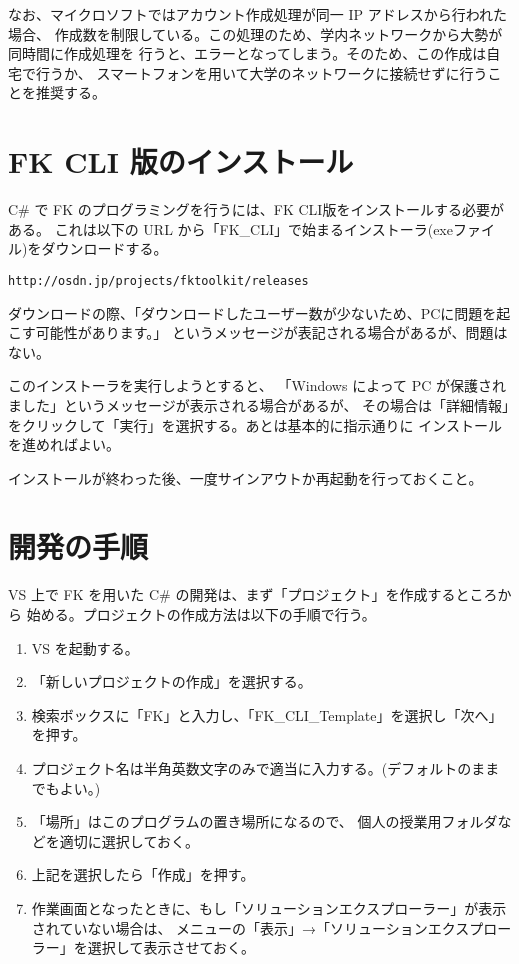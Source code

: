 \documentclass[a4paper]{jsarticle}
\begin{document}
なお、マイクロソフトではアカウント作成処理が同一 IP アドレスから行われた場合、
作成数を制限している。この処理のため、学内ネットワークから大勢が同時間に作成処理を
行うと、エラーとなってしまう。そのため、この作成は自宅で行うか、
スマートフォンを用いて大学のネットワークに接続せずに行うことを推奨する。

\section{FK CLI 版のインストール}

C\# で FK のプログラミングを行うには、FK CLI版をインストールする必要がある。
これは以下の URL から「FK\_CLI」で始まるインストーラ(exeファイル)をダウンロードする。

\begin{screen}
\begin{center}
	\verb+http://osdn.jp/projects/fktoolkit/releases+
\end{center}
\end{screen}
ダウンロードの際、「ダウンロードしたユーザー数が少ないため、PCに問題を起こす可能性があります。」
というメッセージが表記される場合があるが、問題はない。

このインストーラを実行しようとすると、
「Windows によって PC が保護されました」というメッセージが表示される場合があるが、
その場合は「詳細情報」をクリックして「実行」を選択する。あとは基本的に指示通りに
インストールを進めればよい。

インストールが終わった後、一度サインアウトか再起動を行っておくこと。

\section{開発の手順}

VS 上で FK を用いた C\# の開発は、まず「プロジェクト」を作成するところから
始める。プロジェクトの作成方法は以下の手順で行う。

\begin{enumerate}

 \item VS を起動する。

 \item 「新しいプロジェクトの作成」を選択する。

 \item 検索ボックスに「FK」と入力し、「FK\_CLI\_Template」を選択し「次へ」を押す。

 \item プロジェクト名は半角英数文字のみで適当に入力する。(デフォルトのままでもよい。)

 \item 「場所」はこのプログラムの置き場所になるので、
		個人の授業用フォルダなどを適切に選択しておく。

 \item 上記を選択したら「作成」を押す。

 \item 作業画面となったときに、もし「ソリューションエクスプローラー」が表示されていない場合は、
	メニューの「表示」→「ソリューションエクスプローラー」を選択して表示させておく。

\end{enumerate}
\end{document}
